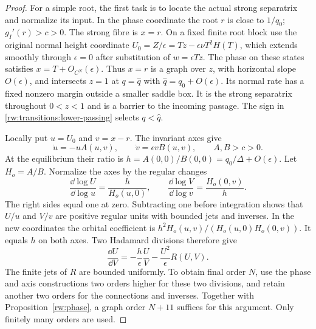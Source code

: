 \begin{proof}
For a simple root, the first task is to locate the actual strong
separatrix and normalize its input.  In the phase coordinate the root
$r$ is close to $1/q_0$;
$g_I'(r)>c>0$. The strong fibre is $x=r$. On a fixed finite root
block use the original normal height coordinate
$U_0=Z/\epsilon=Tz-\epsilon\nu T^2H(T)$, which extends smoothly
through $\epsilon=0$ after substitution of $w=\epsilon Tz$.
The phase on these states satisfies $x=T+O_{C^N}(\epsilon)$.
Thus $x=r$ is a graph over $z$, with horizontal slope
$O(\epsilon)$, and intersects $z=1$ at $q=\widehat q$ with
$\widehat q=q_0+O(\epsilon)$. Its normal rate has a fixed nonzero
margin outside a smaller saddle box. It is the strong separatrix
throughout $0<z<1$ and is a barrier to the incoming passage.
The sign in \eqref{rw:transitions:lower-passing} selects
$q<\widehat q$.

Locally put $u=U_0$ and $v=x-r$. The invariant axes give
\[
 \dot u=-uA(u,v),\qquad \dot v=\epsilon vB(u,v),
 \qquad A,B>c>0.
\]
At the equilibrium their ratio is
$h=A(0,0)/B(0,0)=q_0/\Delta+O(\epsilon)$.
Let $H_o=A/B$. Normalize the axes by the regular changes
\begin{equation}\label{rw:transitions:axis-normalization}
 \frac{\dd\log U}{\dd\log u}=\frac{h}{H_o(u,0)},
 \qquad
 \frac{\dd\log V}{\dd\log v}=\frac{H_o(0,v)}h.
\end{equation}
The right sides equal one at zero. Subtracting one before integration
shows that $U/u$ and $V/v$ are positive regular units with bounded
jets and inverses. In the new coordinates the orbital coefficient is
$h^2H_o(u,v)/(H_o(u,0)H_o(0,v))$. It equals $h$ on both axes.
Two Hadamard divisions therefore give
\begin{equation}\label{rw:transitions:large-ratio-equation}
 \frac{\dd U}{\dd V}
 =-\frac h\epsilon\frac UV-\frac{U^2}\epsilon R(U,V).
\end{equation}
The finite jets of $R$ are bounded uniformly. To obtain final order
$N$, use the phase and axis constructions two orders higher for these
two divisions, and retain another two orders for the connections and
inverses. Together with Proposition~\ref{rw:phase}, a graph order
$N+11$ suffices for this argument. Only finitely many orders are used.


\end{proof}
